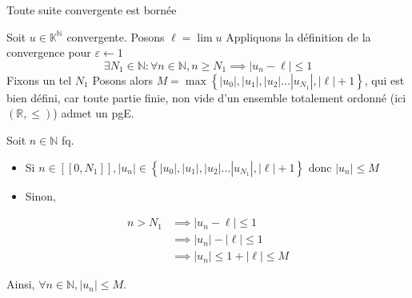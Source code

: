 \documentclass{article}
\renewenvironment{question_kholle}[2][ ]
{
	\subsection{\texorpdfstring{#2}{}}
	\notblank{#1}
	{
		\noindent #1
		\bigbreak
	}
	{}
	\begin{proof}
}
{
	\end{proof}
}
\begin{document}
\begin{question_kholle}{Toute suite convergente est bornée}

	Soit $u \in \mathbb{K}^{\mathbb{N}}$ convergente.
	Posons $\ell = \lim u$
	Appliquons la définition de la convergence pour $\varepsilon \leftarrow 1$
	$$
		\exists N_{1}\in \mathbb{N}: \forall n \in \mathbb{N}, n \geqslant N_{1} \implies |u_{n}-\ell| \leqslant 1
	$$
	Fixons un tel $N_{1}$
	Posons alors $M = \max\left\{ |u_{0}|, |u_{1}|, |u_{2}| \dots |u_{N_{1}}|, |\ell|+1 \right\}$, qui est bien défini, car toute partie finie, non vide d'un ensemble totalement ordonné (ici $(\mathbb{R}, \leqslant)$) admet un pgE.

	Soit $n \in \mathbb{N}$ fq.
	\begin{itemize}
		\item Si $n \in [\! [0, N_{1}]\!], |u_{n}| \in \left\{ |u_{0}|, |u_{1}|, |u_{2}| \dots |u_{N_{1}}|, |\ell|+1 \right\}$ donc $|u_{n}| \leqslant M$
		\item Sinon,
	\end{itemize}

	\begin{align*}
		n> N_{1} & \implies |u_{n} - \ell| \leqslant 1              \\
		         & \implies |u_{n}| - |\ell| \leqslant 1            \\
		         & \implies |u_{n}| \leqslant 1+ |\ell| \leqslant M
	\end{align*}

	Ainsi, $\forall n \in \mathbb{N}, |u_{n}| \leqslant M$.
\end{question_kholle}


\pagebreak
\end{document}
